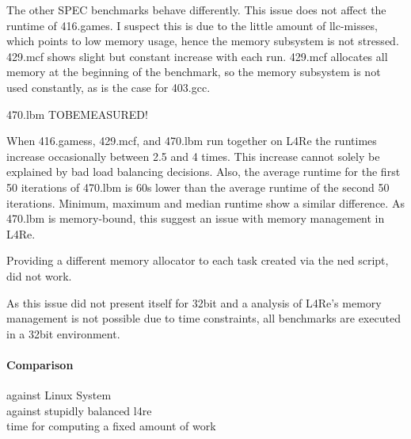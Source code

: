 The other SPEC benchmarks behave differently.
This issue does not affect the runtime of 416.games.
I suspect this is due to the little amount of \gls{llc}-misses, which points to
low memory usage, hence the memory subsystem is not stressed.
429.mcf shows slight but constant increase with each run.
429.mcf allocates all memory at the beginning of the benchmark, so the memory
subsystem is not used constantly, as is the case for 403.gcc.

470.lbm  TOBEMEASURED!


When 416.gamess, 429.mcf, and 470.lbm run together on L4Re the runtimes
increase occasionally between 2.5 and 4 times.
This increase cannot solely be explained by bad load balancing decisions.
Also, the average runtime for the first 50 iterations of 470.lbm is 60s lower
than the average runtime of the second 50 iterations.
Minimum, maximum and median runtime show a similar difference.
As 470.lbm is memory-bound, this suggest an issue with memory management
in L4Re.

Providing a different memory allocator to each task created via the ned script,
did not work.

As this issue did not present itself for 32bit and a analysis of L4Re's memory
management is not possible due to time constraints, all benchmarks are executed
in a 32bit environment.


\paragraph{Comparison}
  against Linux System \\
  against stupidly balanced l4re \\
  time for computing a fixed amount of work \\



\cleardoublepage

